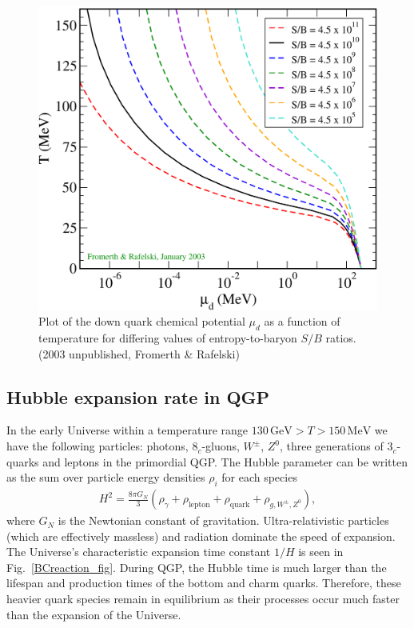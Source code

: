 \documentclass[universe,article,submit,moreauthors,pdftex,a4paper]{Definitions/mdpi}
\newcommand*{\rf}[1]{Fig.~{\ref{#1}}}
\begin{document}
\begin{figure}[h]
  \centering
  \includegraphics[width=\linewidth]{./extra/Tmud1.pdf}
  \caption{Plot of the down quark chemical potential $\mu_{d}$ as a function of temperature for differing values of entropy-to-baryon $S/B$ ratios. (2003 unpublished, Fromerth \& Rafelski) \cite{Rafelski:2019twp}}
  \label{QGPchem2} 
\end{figure}

\subsection {Hubble expansion rate in QGP}
\noindent In the early Universe within a temperature range $130\, \mathrm{GeV}>T>150\, \mathrm{MeV}$  we have the following particles:  photons, $8_c$-gluons, $W^\pm$, $Z^0$, three generations of $3_c$-quarks and leptons  in the primordial QGP.  The Hubble parameter can be written as the sum over particle energy densities $\rho_i$ for each species
\begin{align}
H^2=\frac{8\pi G_{N}}{3}\left(\rho_\gamma+\rho_{\mathrm{lepton}}+\rho_{\mathrm{quark}}+\rho_{g,{W^\pm},{Z^0}}\right),
\end{align}
where $G_{N}$ is the Newtonian constant of gravitation. Ultra-relativistic particles (which are effectively massless) and radiation dominate the speed of expansion. The Universe's characteristic expansion time constant $1/H$ is seen in  \rf{BCreaction_fig}. During QGP, the Hubble time is much larger than the lifespan and production times of the bottom and charm quarks. Therefore, these heavier quark species remain in equilibrium as their processes occur much faster than the expansion of the Universe.
\end{document}
